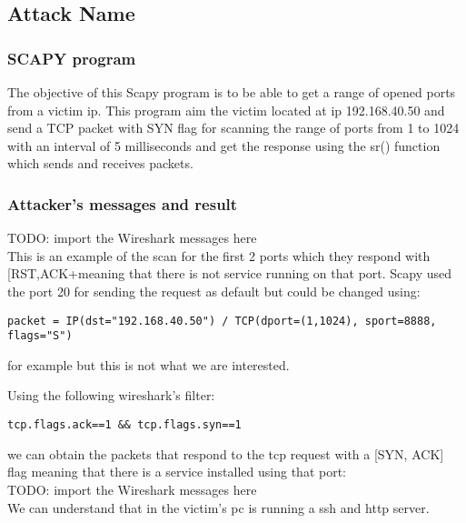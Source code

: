 \subsection{Attack Name}
\subsubsection{SCAPY program}

The objective of this Scapy program is to be able to get a range of opened ports from a victim ip. This program aim the victim located at ip 192.168.40.50 and send a TCP packet with SYN flag for scanning the range of ports from 1 to 1024 with an interval of 5 milliseconds and get the response using the sr() function which sends and receives packets.\par

\subsubsection{Attacker’s messages and result}
{\huge{TODO: import the Wireshark messages here}}\\

This is an example of the scan for the first 2 ports which they respond with [RST,ACK+meaning that there is not service running on that port.
Scapy used the port 20 for sending the request as default but could be changed using:\\
\begin{lstlisting}
packet = IP(dst="192.168.40.50") / TCP(dport=(1,1024), sport=8888, flags="S")
\end{lstlisting}
for example but this is not what we are interested.\par
Using the following wireshark’s filter: \\
\begin{lstlisting}
tcp.flags.ack==1 && tcp.flags.syn==1
\end{lstlisting}
we can obtain the packets that respond to the tcp request with a [SYN, ACK] flag meaning that there is a service installed using that port:\\

{\huge{TODO: import the Wireshark messages here}}\\

We can understand that in the victim’s pc is running a ssh and http server.\par

